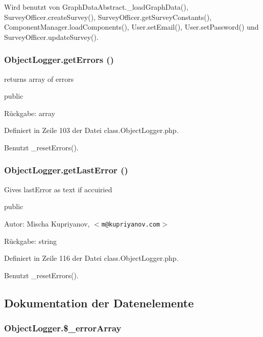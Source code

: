 Wird benutzt von GraphDataAbstract.\_\-loadGraphData(), SurveyOfficer.createSurvey(), SurveyOfficer.getSurveyConstants(), ComponentManager.loadComponents(), User.setEmail(), User.setPassword() und SurveyOfficer.updateSurvey().
\subsubsection{\setlength{\rightskip}{0pt plus 5cm}ObjectLogger.getErrors ()}\label{classObjectLogger_972ed527bf7f3ff3a7cf0a00b2eb8f59}


returns array of errors

public \begin{Desc}
\item[Rückgabe:]array \end{Desc}


Definiert in Zeile 103 der Datei class.ObjectLogger.php.

Benutzt \_\-resetErrors().
\subsubsection{\setlength{\rightskip}{0pt plus 5cm}ObjectLogger.getLastError ()}\label{classObjectLogger_4dff6e98f5955e509a4db5ed9f01e075}


Gives lastError as text if accuiried

public \begin{Desc}
\item[Autor:]Mischa Kupriyanov, $<${\tt m@kupriyanov.com}$>$ \end{Desc}
\begin{Desc}
\item[Rückgabe:]string \end{Desc}


Definiert in Zeile 116 der Datei class.ObjectLogger.php.

Benutzt \_\-resetErrors().

\subsection{Dokumentation der Datenelemente}
\subsubsection{\setlength{\rightskip}{0pt plus 5cm}ObjectLogger.\$\_\-errorArray}\label{classObjectLogger_d5bd26e05691edf51c66e586884ec434}




